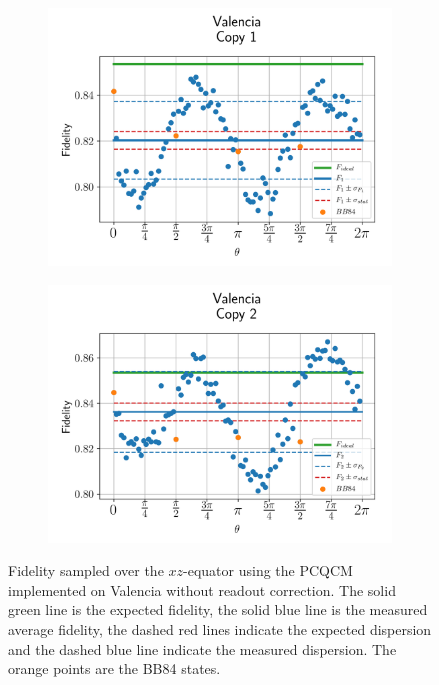   
  \begin{figure}[H]
    \centering
    \begin{subfigure}{.5\textwidth}
      \centering
      \includegraphics[width=\textwidth]{Figures/PhaseCovariant/IBM/OnlyEquator/results_valencia_copy1.png}
      \label{fig:pc_uncorrected_valencia_equator_1}
    \end{subfigure}%
    \begin{subfigure}{.5\textwidth}
      \centering
      \includegraphics[width=\textwidth]{Figures/PhaseCovariant/IBM/OnlyEquator/results_valencia_copy2.png}
      \label{fig:pc_uncorrected_valencia_equator_2}
    \end{subfigure}
    \vspace{-0.5cm}
    \caption{Fidelity sampled over the $xz$-equator using the PCQCM implemented on Valencia without readout correction. The solid green line is the expected fidelity, the solid blue line is the measured average fidelity, the dashed red lines indicate the expected dispersion and the dashed blue line indicate the measured dispersion. The orange points are the BB84 states.}
    \label{fig:pc_uncorrected_valencia_equator}
  \end{figure}
  
